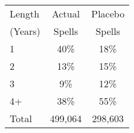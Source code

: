 \begin{tabular}{lcc}
\toprule
Length & Actual & Placebo \\
(Years) & Spells & Spells \\
\midrule
1 & 40\% & 18\% \\
2 & 13\% & 15\% \\
3 & 9\% & 12\% \\
4+ & 38\% & 55\% \\
Total &      499,064 &      298,603 \\
\bottomrule
\end{tabular}
